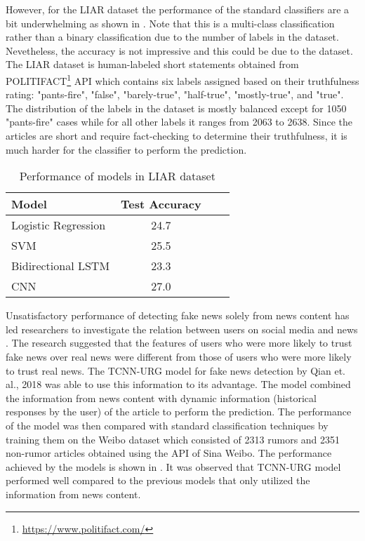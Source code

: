 However, for the LIAR dataset the performance of the standard classifiers are a bit underwhelming as shown in  \cite{wang2017liar}.  Note that this is a multi-class classification rather than a binary classification due to the number of labels in the dataset. Nevetheless, the accuracy is not impressive and this could be due to the dataset.  The LIAR dataset is human-labeled short statements obtained from POLITIFACT\footnote{\url{https://www.politifact.com/}} API which contains six labels assigned based on their truthfulness rating: "pants-fire", "false", "barely-true", "half-true", "mostly-true", and "true". The distribution of the labels in the dataset is mostly balanced except for 1050 "pants-fire" cases while for all other labels it ranges from 2063 to 2638. Since the articles are short and require fact-checking to determine their truthfulness, it is much harder for the classifier to perform the prediction.

\begin{table}[h]
\begin{center}
\caption{Performance of models in LIAR dataset}
\label{tbl:liar_performance}
\begin{tabular}{lccc}
\toprule 
Model&Test Accuracy\\
\midrule 
Logistic Regression&24.7\\
SVM&25.5\\
Bidirectional LSTM&23.3\\
CNN&27.0\\
\bottomrule
\end{tabular}
\end{center}
\end{table}

Unsatisfactory performance of detecting fake news solely from news content has led researchers to investigate the relation between users on social media and news \cite{shu2018understanding}. The research suggested that the features of users who were more likely to trust fake news over real news were different from those of users who were more likely to trust real news. The TCNN-URG model for fake news detection by Qian et. al., 2018 was able to use this information to its advantage. The model combined the information from news content with dynamic information (historical responses by the user) of the article to perform the prediction. The performance of the model was then compared with standard classification techniques by training them on the Weibo dataset\cite{ma2016detecting} which consisted of 2313 rumors and 2351 non-rumor articles obtained using the API of Sina Weibo. The performance achieved by the models is shown in  \cite{qian2018neural}. It was observed that TCNN-URG model performed well compared to the previous models that only utilized the information from news content.

